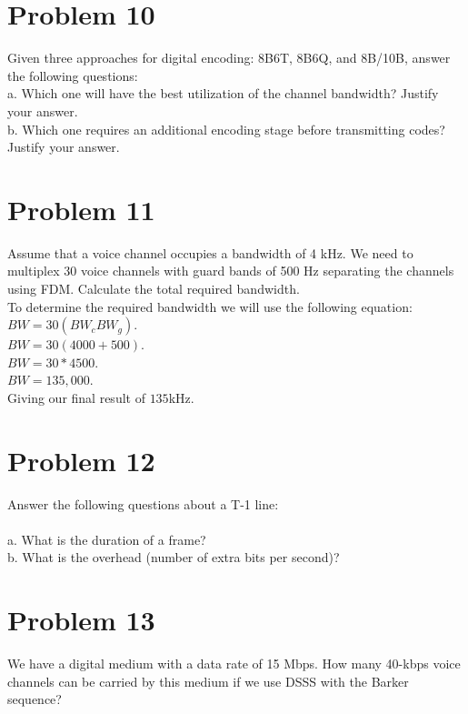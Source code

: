 \documentclass{article}
\begin{document}
\section*{Problem 10}
Given three approaches for digital encoding: 8B6T, 8B6Q, and 8B/10B, answer the
following questions:\\
\subP a. Which one will have the best utilization of the channel bandwidth? Justify your answer.\\
\subP b. Which one requires an additional encoding stage before transmitting codes? Justify your
answer.\\

\section*{Problem 11} %
Assume that a voice channel occupies a bandwidth of 4 kHz. We need to multiplex 30 voice
channels with guard bands of 500 Hz separating the channels using FDM. Calculate the total
required bandwidth.\\
To determine the required bandwidth we will use the following equation:\\
$BW = 30(BW_{c} BW_{g})$.\\
$BW = 30(4000 + 500)$.\\
$BW = 30 * 4500$.\\
$BW = 135,000$.\\
Giving our final result of $135$kHz.\\

\section*{Problem 12} %
Answer the following questions about a T-1 line:\\\\
\subP a. What is the duration of a frame?\\
\subP b. What is the overhead (number of extra bits per second)?\\

\section*{Problem 13}
We have a digital medium with a data rate of 15 Mbps. How many 40-kbps voice channels can be
carried by this medium if we use DSSS with the Barker sequence?\\\\
\end{document}
